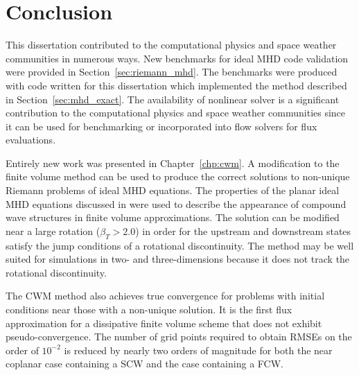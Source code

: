 %
%


\chapter[Conclusion]{Conclusion}
\label{chp:conclusion}

This dissertation contributed to the computational physics and space weather communities in numerous ways.  New benchmarks for ideal MHD code validation were provided in Section~\ref{sec:riemann_mhd}.  The benchmarks were produced with code written for this dissertation which implemented the method described in Section~\ref{sec:mhd_exact}.  The availability of nonlinear solver is a significant contribution to the computational physics and space weather communities since it can be used for benchmarking or incorporated into flow solvers for flux evaluations.  

Entirely new work was presented in Chapter~\ref{chp:cwm}.  A modification to the finite volume method can be used to produce the correct solutions to non-unique Riemann problems of ideal MHD equations.  The properties of the planar ideal MHD equations discussed in \citep{Falle:2001} were used to describe the appearance of compound wave structures in finite volume approximations.  The solution can be modified near a large rotation ($\beta_T > 2.0$) in order for the upstream and downstream states satisfy the jump conditions of a rotational discontinuity.  The method may be well suited for simulations in two- and three-dimensions because it does not track the rotational discontinuity.

The CWM method also achieves true convergence for problems with initial conditions near those with a non-unique solution.  It is the first flux approximation for a dissipative finite volume scheme that does not exhibit pseudo-convergence.  The number of grid points required to obtain RMSEs on the order of $10^{-2}$ is reduced by nearly two orders of magnitude for both the near coplanar case containing a SCW and the case containing a FCW.  

